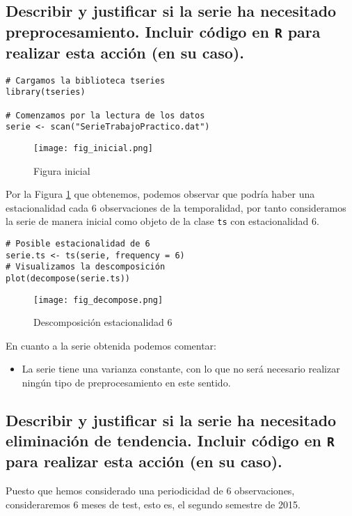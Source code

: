\documentclass[11pt]{article}
\begin{document}
\subsection{Describir y justificar si la serie ha necesitado preprocesamiento. Incluir código en \texttt{R} para realizar esta acción (en su caso).}
\label{sec:org4ade365}


\begin{verbatim}
# Cargamos la biblioteca tseries
library(tseries)

# Comenzamos por la lectura de los datos 
serie <- scan("SerieTrabajoPractico.dat")
\end{verbatim}

\begin{figure}[htbp]
\centering
\texttt{[image: fig\_inicial.png]}
\caption{\label{fig:orgf2a328e}
Figura inicial}
\end{figure}

Por la Figura \ref{fig:orgf2a328e} que obtenemos, podemos observar que podría haber una
estacionalidad cada 6 observaciones de la temporalidad, por tanto
consideramos la serie de manera inicial como objeto de la clase \texttt{ts}
con estacionalidad 6.

\begin{verbatim}
# Posible estacionalidad de 6
serie.ts <- ts(serie, frequency = 6)
# Visualizamos la descomposición
plot(decompose(serie.ts))
\end{verbatim}

\begin{figure}[htbp]
\centering
\texttt{[image: fig\_decompose.png]}
\caption{\label{fig:orgcb9a16e}
Descomposición estacionalidad 6}
\end{figure}

En cuanto a la serie obtenida podemos comentar: 
\begin{itemize}
\item La serie tiene una varianza constante, con lo que no será necesario
realizar ningún tipo de preprocesamiento en este sentido.
\end{itemize}


\subsection{Describir y justificar si la serie ha necesitado eliminación de tendencia. Incluir código en \texttt{R} para realizar esta acción (en su caso).}
\label{sec:orgeb09368}
Puesto que hemos considerado una periodicidad de 6
  observaciones, consideraremos 6 meses de test, esto es, el segundo
  semestre de 2015. 
\end{document}
